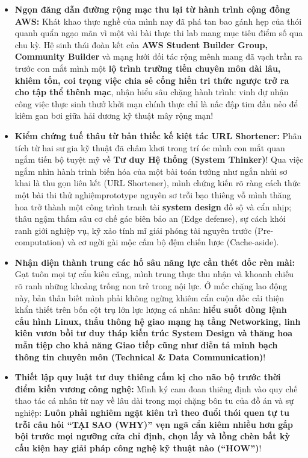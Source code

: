 \begin{itemize}
\item
  \textbf{Ngọn đăng dẫn đường rộng mạc thu lại từ hành trình cộng đồng
  AWS:} Khát khao thực nghề của mình nay đã phá tan bao gánh hẹp của
  thói quanh quẩn ngạo mãn vì một vài bài thực thi lab mang mục tiêu
  điểm số qua chu kỳ. Hệ sinh thái đoàn kết của \textbf{AWS Student
  Builder Group, Community Builder} và mạng lưới đối tác rộng mênh mang
  đã vạch trần ra trước con mắt mình một \textbf{lộ trình trường tiến
  chuyên môn dài lâu, khiêm tốn, coi trọng việc chia sẻ cống hiến tri
  thức ngược trở ra cho tập thể thênh mạc}, nhận hiểu sâu chặng hành
  trình: vinh dự nhận công việc thực sinh thưở khởi mạn chính thực chỉ
  là nấc đập tim đầu nẻo để kiêm gan bơi giữa hải dương kỹ thuật mây
  rộng mạn!
\item
  \textbf{Kiểm chứng tuế thâu từ bản thiếc kế kiệt tác URL Shortener:}
  Phân tích từ hai sư gia kỹ thuật đã châm khơi trong trí óc mình con
  mắt quan ngắm tiến bộ tuyệt mỹ về \textbf{Tư duy Hệ thống (System
  Thinker)}! Qua việc ngắm nhìn hành trình biến hóa của một bài toán
  tưởng như ngắn nhủi sơ khai là thu gọn liên kết (URL Shortener), mình
  chứng kiến rõ ràng cách thức một bài thi thử nghiệmprototype nguyên sơ
  trỗi bạo thiêng vỗ mình thăng hoa trở thành một công trình tranh tài
  \textbf{system design} đồ sộ và cẩn nhịp; thâu ngậm thấm sâu cơ chế
  gác biên bảo an (Edge defense), sự cách khói ranh giới nghiệp vụ, kỹ
  xảo tính mĩ giải phóng tài nguyên trước (Pre-computation) và cơ ngời
  gài mộc cấm bộ đệm chiến lược (Cache-aside).
\item
  \textbf{Nhận diện thành trung các hố sâu năng lực cần thét dốc rèn
  mài:} Gạt tuôn mọi tự cẩu kiêu căng, mình trung thực thu nhận và
  khoanh chiếu rõ ranh những khoảng trống non trẻ trong nội lực. Ở mốc
  chặng lao động này, bản thân biết mình phải không ngừng khiêm cẩn cuộn
  dốc cải thiện khẩn thiết trên bốn cột trụ lớn lực lượng cá nhân:
  \textbf{hiểu suốt dòng lệnh cấu hình Linux, thấu thông hệ giao mạng hạ
  tầng Networking, linh kiên vươn bồi tư duy tháp kiến trúc System
  Design và thăng hoa mẫn tiệp cho khả năng Giao tiếp cũng như diễn tả
  minh bạch thông tin chuyên môn (Technical \& Data Communication)}!
\item
  \textbf{Thiết lập quy luật tư duy thiêng cấm kị cho não bộ trước thời
  điểm kiến vương công nghệ:} Mình ký cam đoan thiêng định vào quy chế
  thao tác cá nhân từ nay về lâu dài trong mọi chặng bôn tu của đồ án và
  sự nghiệp: \textbf{Luôn phải nghiêm ngặt kiên trì theo đuổi thói quen
  tự tu trỗi câu hỏi ``TẠI SAO (WHY)'' vẹn ngã cẩn kiêm nhiều hơn gấp
  bội trước mọi ngưỡng cửa chỉ định, chọn lấy và lồng chèn bất kỳ cấu
  kiện hay giải pháp công nghệ kỹ thuật nào (``HOW'')}!
\end{itemize}

